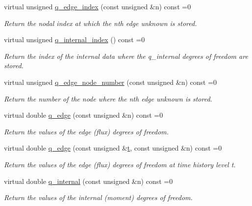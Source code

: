 \begin{DoxyCompactItemize}
virtual unsigned \hyperlink{classoomph_1_1PoroelasticityEquations_abe5fd6d829fcefd5760c8802f7887631}{q\+\_\+edge\+\_\+index} (const unsigned \&n) const =0
\begin{DoxyCompactList}\small\item\em Return the nodal index at which the nth edge unknown is stored. \end{DoxyCompactList}\item 
virtual unsigned \hyperlink{classoomph_1_1PoroelasticityEquations_a51f9afadce69aeb1ca777d5266f5c4d2}{q\+\_\+internal\+\_\+index} () const =0
\begin{DoxyCompactList}\small\item\em Return the index of the internal data where the q\+\_\+internal degrees of freedom are stored. \end{DoxyCompactList}\item 
virtual unsigned \hyperlink{classoomph_1_1PoroelasticityEquations_a34a28eb238815fe3475c09ed256393c4}{q\+\_\+edge\+\_\+node\+\_\+number} (const unsigned \&n) const =0
\begin{DoxyCompactList}\small\item\em Return the number of the node where the nth edge unknown is stored. \end{DoxyCompactList}\item 
virtual double \hyperlink{classoomph_1_1PoroelasticityEquations_a67d1df907b555608c1692efdd278a5d7}{q\+\_\+edge} (const unsigned \&n) const =0
\begin{DoxyCompactList}\small\item\em Return the values of the edge (flux) degrees of freedom. \end{DoxyCompactList}\item 
virtual double \hyperlink{classoomph_1_1PoroelasticityEquations_aed66c1aeaa3cadb53537c5a74684ddec}{q\+\_\+edge} (const unsigned \&\hyperlink{cfortran_8h_af6f0bd3dc13317f895c91323c25c2b8f}{t}, const unsigned \&n) const =0
\begin{DoxyCompactList}\small\item\em Return the values of the edge (flux) degrees of freedom at time history level t. \end{DoxyCompactList}\item 
virtual double \hyperlink{classoomph_1_1PoroelasticityEquations_a95ed7bb3ad2efe901453f99f1e42c0a6}{q\+\_\+internal} (const unsigned \&n) const =0
\begin{DoxyCompactList}\small\item\em Return the values of the internal (moment) degrees of freedom. \end{DoxyCompactList}\item 

\end{DoxyCompactItemize}

